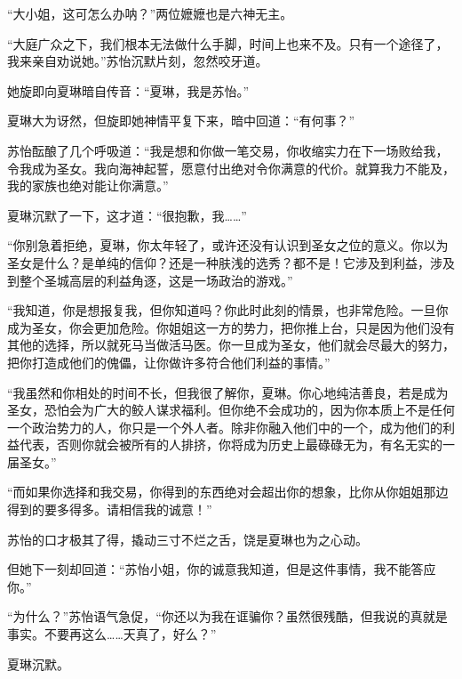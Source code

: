 \begin{this_body}
“大小姐，这可怎么办呐？”两位嬷嬷也是六神无主。

“大庭广众之下，我们根本无法做什么手脚，时间上也来不及。只有一个途径了，我来亲自劝说她。”苏怡沉默片刻，忽然咬牙道。

她旋即向夏琳暗自传音：“夏琳，我是苏怡。”

夏琳大为讶然，但旋即她神情平复下来，暗中回道：“有何事？”

苏怡酝酿了几个呼吸道：“我是想和你做一笔交易，你收缩实力在下一场败给我，令我成为圣女。我向海神起誓，愿意付出绝对令你满意的代价。就算我力不能及，我的家族也绝对能让你满意。”

夏琳沉默了一下，这才道：“很抱歉，我……”

“你别急着拒绝，夏琳，你太年轻了，或许还没有认识到圣女之位的意义。你以为圣女是什么？是单纯的信仰？还是一种肤浅的选秀？都不是！它涉及到利益，涉及到整个圣城高层的利益角逐，这是一场政治的游戏。”

“我知道，你是想报复我，但你知道吗？你此时此刻的情景，也非常危险。一旦你成为圣女，你会更加危险。你姐姐这一方的势力，把你推上台，只是因为他们没有其他的选择，所以就死马当做活马医。你一旦成为圣女，他们就会尽最大的努力，把你打造成他们的傀儡，让你做许多符合他们利益的事情。”

“我虽然和你相处的时间不长，但我很了解你，夏琳。你心地纯洁善良，若是成为圣女，恐怕会为广大的鲛人谋求福利。但你绝不会成功的，因为你本质上不是任何一个政治势力的人，你只是一个外人者。除非你融入他们中的一个，成为他们的利益代表，否则你就会被所有的人排挤，你将成为历史上最碌碌无为，有名无实的一届圣女。”

“而如果你选择和我交易，你得到的东西绝对会超出你的想象，比你从你姐姐那边得到的要多得多。请相信我的诚意！”

苏怡的口才极其了得，撬动三寸不烂之舌，饶是夏琳也为之心动。

但她下一刻却回道：“苏怡小姐，你的诚意我知道，但是这件事情，我不能答应你。”

“为什么？”苏怡语气急促，“你还以为我在诓骗你？虽然很残酷，但我说的真就是事实。不要再这么……天真了，好么？”

夏琳沉默。

\end{this_body}

